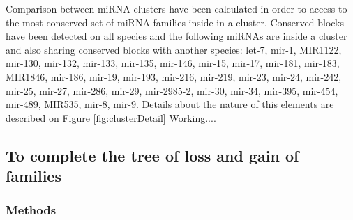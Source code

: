 \documentclass[11pt]{article}
\newcommand{\CAVH}[1]{\begingroup\color{red}#1\endgroup}
\begin{document}

Comparison between miRNA clusters have been calculated in order to access to the 
most conserved set of miRNA families inside in a cluster. Conserved blocks have 
been detected on all species and the following miRNAs are inside a 
cluster and also sharing conserved blocks with another species: let-7, mir-1, 
MIR1122, mir-130, mir-132, mir-133, mir-135, mir-146, mir-15, mir-17, mir-181, 
mir-183, MIR1846, mir-186, mir-19, mir-193, mir-216, mir-219, mir-23, mir-24, 
mir-242, mir-25, mir-27, mir-286, mir-29, mir-2985-2, mir-30, mir-34, mir-395, 
mir-454, mir-489, MIR535, mir-8, mir-9. Details about the nature of this 
elements are described on Figure \ref{fig:clusterDetail} \CAVH{Working...}.


\subsection*{To complete the tree of loss and gain of families}
\subsubsection*{Methods}
\end{document}
